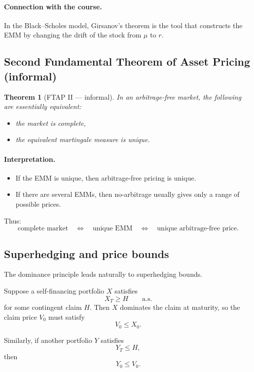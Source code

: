\documentclass[11pt]{article}
\newcommand{\1}{\mathbf{1}}
\theoremstyle{plain}
\newtheorem{theorem}{Theorem}[section]
\theoremstyle{definition}
\theoremstyle{remark}
\begin{document}
\paragraph{Connection with the course.}
In the Black--Scholes model, Girsanov's theorem is the tool that constructs the EMM by changing the drift of the stock from \(\mu\) to \(r\).

\subsection{Second Fundamental Theorem of Asset Pricing (informal)}

\begin{theorem}[FTAP II --- informal]
In an arbitrage-free market, the following are essentially equivalent:
\begin{itemize}
    \item the market is complete,
    \item the equivalent martingale measure is unique.
\end{itemize}
\end{theorem}

\paragraph{Interpretation.}
\begin{itemize}
    \item If the EMM is unique, then arbitrage-free pricing is unique.
    \item If there are several EMMs, then no-arbitrage usually gives only a range of possible prices.
\end{itemize}

Thus:
\[
\text{complete market}
\quad\Longleftrightarrow\quad
\text{unique EMM}
\quad\Longleftrightarrow\quad
\text{unique arbitrage-free price.}
\]

\subsection{Superhedging and price bounds}

The dominance principle leads naturally to superhedging bounds.

Suppose a self-financing portfolio \(X\) satisfies
\[
X_T\ge H
\qquad\text{a.s.}
\]
for some contingent claim \(H\).
Then \(X\) dominates the claim at maturity, so the claim price \(V_0\) must satisfy
\[
\boxed{\ V_0\le X_0.\ }
\]

Similarly, if another portfolio \(Y\) satisfies
\[
Y_T\le H,
\]
then
\[
\boxed{\ Y_0\le V_0.\ }
\]
\end{document}

